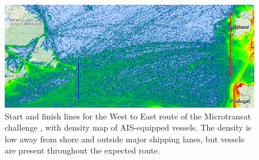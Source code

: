\begin{figure}[H]
\centering
\includegraphics[width=150mm,natwidth=792,natheight=313]{"./image/AIS_density_sailbot_route"}
\caption[Microtransat route and vessel density]{\label{fig:route_density}Start and finish lines for the West to East route of the Microtransat challenge \cite{transat__w-e_start-finish}, with density map of AIS-equipped vessels.  The density is low away from shore and outside major shipping lanes, but vessels are present throughout the expected route.}
\end{figure}

